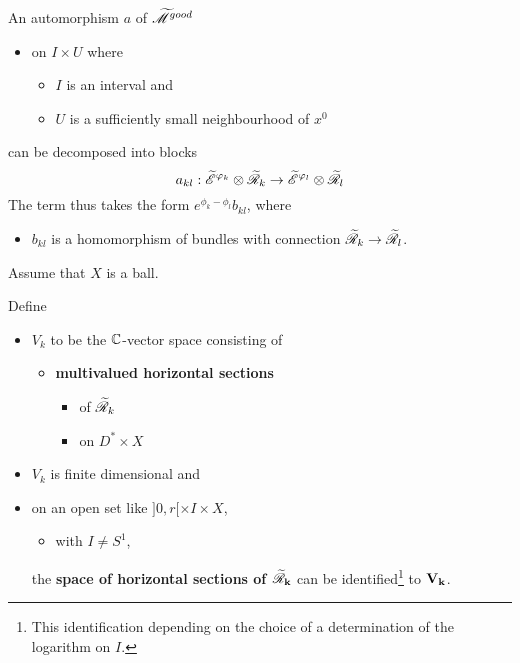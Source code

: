 An automorphism $a$ of $\widetilde{\mathscr{M}}^{good}$
\begin{itemize}
  \item on $I\times U$ where
    \begin{itemize}
      \item $I$ is an interval and
      \item $U$ is a sufficiently small neighbourhood of $x^0$
    \end{itemize}
\end{itemize}
can be decomposed into blocks
\[
  a_{kl}:\widetilde{\mathscr{E}}^{\varphi_k}\otimes\widetilde{\mathscr{R}}_k
    \to
    \widetilde{\mathscr{E}}^{\varphi_l}\otimes\widetilde{\mathscr{R}}_l
\]
The term thus takes the form $e^{\phi_k-\phi_l}b_{kl}$, where
\begin{itemize}
  \item $b_{kl}$ is a homomorphism of bundles with connection
    $\widetilde{\mathscr{R}}_k\to\widetilde{\mathscr{R}}_l$.
\end{itemize}
Assume that $X$ is a ball.
\begin{defn}
  Define
  \begin{itemize}
    \item $V_k$ to be the $\mathbb{C}$-vector space consisting of
      \begin{itemize}
        \item \textbf{multivalued horizontal sections}
          \begin{itemize}
            \item of $\widetilde{\mathscr{R}}_k$
            \item on $D^*\times X$
          \end{itemize}
      \end{itemize}
  \end{itemize}
  \begin{rem}
    \begin{itemize}
      \item $V_k$ is finite dimensional and
      \item on an open set like $]0,r[\times I\times X$,
        \begin{itemize}
          \item with $I\neq S^1$,
        \end{itemize}
        the \textbf{space of horizontal sections of $\bf\widetilde{\mathscr{R}}_k$}
        can be identified\footnote{This identification depending on the choice
        of a determination of the logarithm on $I$.} to \textbf{$\bf V_k$}.
    \end{itemize}
  \end{rem}
\end{defn}
